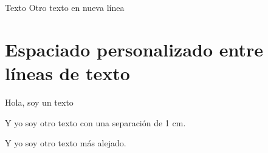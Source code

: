 Texto
\newline
Otro texto en nueva línea


\section{Espaciado personalizado entre líneas de texto}

Hola, soy un texto

\vspace{1cm}
Y yo soy otro texto con una separación de 1 cm.

\vspace{50pt}
Y yo soy otro texto más alejado.
